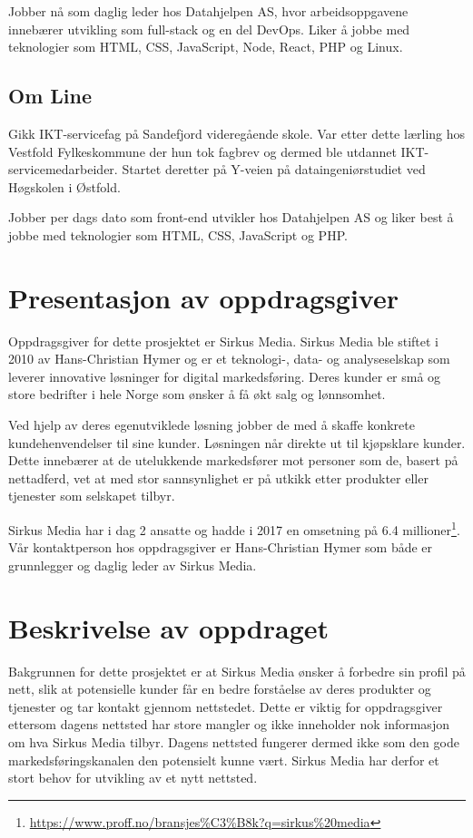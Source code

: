 Jobber nå som daglig leder hos Datahjelpen AS, hvor arbeidsoppgavene innebærer utvikling som full-stack og en del DevOps. Liker å jobbe med teknologier som HTML, CSS, JavaScript, Node, React, PHP og Linux.

\subsection{Om Line}
Gikk IKT-servicefag på Sandefjord videregående skole. Var etter dette lærling hos Vestfold Fylkeskommune der hun tok fagbrev og dermed ble utdannet IKT-servicemedarbeider. Startet deretter på Y-veien på dataingeniørstudiet ved Høgskolen i Østfold.

Jobber per dags dato som front-end utvikler hos Datahjelpen AS og liker best å jobbe med teknologier som HTML, CSS, JavaScript og PHP.

\section{Presentasjon av oppdragsgiver}
Oppdragsgiver for dette prosjektet er Sirkus Media.
Sirkus Media ble stiftet i 2010 av Hans-Christian Hymer og er et teknologi-, data- og analyseselskap som leverer innovative løsninger for digital markedsføring. Deres kunder er små og store bedrifter i hele Norge som ønsker å få økt salg og lønnsomhet. 

Ved hjelp av deres egenutviklede løsning jobber de med å skaffe konkrete kundehenvendelser til sine kunder. Løsningen når direkte ut til kjøpsklare kunder. Dette innebærer at de utelukkende markedsfører mot personer som de, basert på nettadferd, vet at med stor sannsynlighet er på utkikk etter produkter eller tjenester som selskapet tilbyr.

Sirkus Media har i dag 2 ansatte og hadde i 2017 en omsetning på 6.4 millioner\footnote{\url{https://www.proff.no/bransjes\%C3\%B8k?q=sirkus\%20media}}.
Vår kontaktperson hos oppdragsgiver er Hans-Christian Hymer som både er grunnlegger og daglig leder av Sirkus Media. 

\section{Beskrivelse av oppdraget}
\label{sec:oppgaven}
Bakgrunnen for dette prosjektet er at Sirkus Media ønsker å forbedre sin profil på nett, slik at potensielle kunder får en bedre forståelse av deres produkter og tjenester og tar kontakt gjennom nettstedet. Dette er viktig for oppdragsgiver ettersom dagens nettsted har store mangler og ikke inneholder nok informasjon om hva Sirkus Media tilbyr. Dagens nettsted fungerer dermed ikke som den gode markedsføringskanalen den potensielt kunne vært. Sirkus Media har derfor et stort behov for utvikling av et nytt nettsted.

